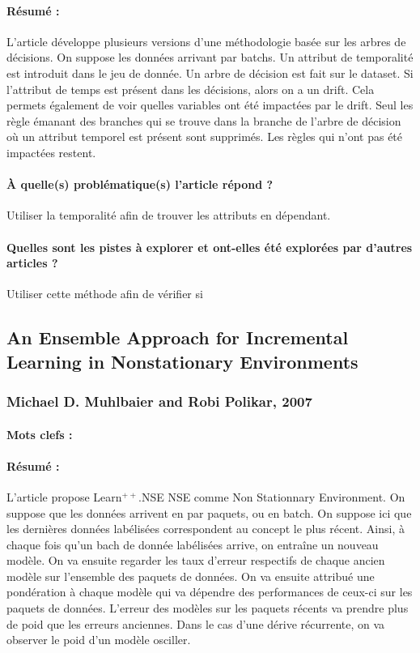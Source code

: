 \documentclass[11pt,a4paper]{report}
\begin{document}
\paragraph{Résumé :} L'article développe plusieurs versions d'une méthodologie basée sur les arbres de décisions.  On suppose les données arrivant par batchs. Un attribut de temporalité est introduit dans le jeu de donnée. Un arbre de décision est fait sur le dataset. Si l’attribut de temps est présent dans les décisions, alors on a un drift. Cela permets également de voir quelles variables ont été impactées par le drift. Seul les règle émanant des branches qui se trouve dans la branche de l’arbre de décision où un attribut temporel est présent sont supprimés. Les règles qui n’ont pas été impactées restent.

\paragraph{À quelle(s) problématique(s) l'article répond ?} Utiliser la temporalité afin de trouver les attributs en dépendant.

\paragraph{Quelles sont les pistes à explorer et ont-elles  été explorées par d'autres articles ?} Utiliser cette méthode afin de vérifier si 



\subsection{An Ensemble Approach for Incremental Learning in Nonstationary Environments}
\subsubsection{Michael D. Muhlbaier and Robi Polikar, 2007}

\paragraph{Mots clefs :} 

\paragraph{Résumé :} L'article propose Learn$^{++}$.NSE NSE comme Non Stationnary Environment. On suppose que les données arrivent en par paquets, ou en batch. On suppose ici que les dernières données labélisées correspondent au concept le plus récent. Ainsi, à chaque fois qu'un bach de donnée labélisées arrive, on entraîne un nouveau modèle. On va ensuite regarder les taux d'erreur respectifs de chaque ancien modèle sur l'ensemble des paquets de données. On va ensuite attribué une pondération à chaque modèle qui va dépendre des performances de ceux-ci sur les paquets de données. L'erreur des modèles sur les paquets récents va prendre plus de poid que les erreurs anciennes. Dans le cas d'une dérive récurrente, on va observer le poid d'un modèle osciller.
\end{document}
